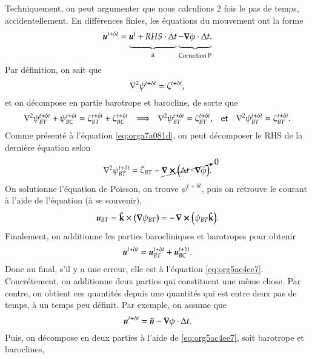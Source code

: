 \documentclass[10pt]{article}
\numberwithin{equation}{section}
\newcommand{\kvf}{\vb{\hat{k}}}
\newcommand{\uu}{\vb*{u}}
\newcommand{\pt}{\hspace{1pt}}
\newcommand{\tall}{\vphantom{A^{x^x}_p}}
\begin{document}
Techniquement, on peut argumenter que nous calculions 2 fois le pas de temps, accidentellement.
En différences finies, les équations du mouvement ont la forme
\begin{equation}
\label{eq:orga7a081d}
   \uu^{t+\delta t} =
   \underbrace{\uu^t + RHS\cdot \Delta t\tall}_{\tilde{u}}
   \underbrace{- \gradient{\phi}\cdot \Delta t.\tall}_\text{Correction P}
\end{equation}
Par définition, on sait que
\begin{equation}
   \laplacian{\psi^{t+\delta t}} = \zeta^{t+\delta t},
\end{equation}
et on décompose en partie barotrope et barocline, de sorte que
\begin{align}
   && \laplacian{\psi^{t+\delta t}_{BT} + \psi^{t+\delta t}_{BC}} = \zeta^{t+\delta t}_{BT} + \zeta^{t+\delta t}_{BC}
   && \Longrightarrow
   && \laplacian{\psi^{t+\delta t}}_{BT} = \zeta^{t+\delta t}_{BT},
   && \text{et}
   && \laplacian{\psi^{t+\delta t}}_{BT} = \zeta^{t+\delta t}_{BT}.&&
\end{align}
Comme présenté à l'équation \ref{eq:orga7a081d}, on peut décomposer le RHS de la dernière équation selon
\begin{align}
   \laplacian{\psi^{t+\delta t}}_{BT} = \tilde{\zeta}_{BT} - \cancelto{0}{\curl(\Delta t\cdot\gradient{\phi})}.
\end{align}
On solutionne l'équation de Poisson, on trouve \(\psi^{t+\delta t}\), puis on retrouve le courant à l'aide de l'équation (à se souvenir), 
\begin{equation}
   \uu_{BT} = \kvf \times \qty(\gradient{\psi_{BT}}) = - \pt\curl(\psi_{BT}\kvf).
\end{equation}
Finalement, on additionne les parties barocliniques et barotropes pour obtenir
\begin{equation}
\label{eq:org5ac4ee7}
   \uu^{t+\delta t} = \uu_{BT}^{t+\delta t} + \uu_{BC}^{t+\delta t}.
\end{equation}
Donc au final, s'il y a une erreur, elle est à l'équation \ref{eq:org5ac4ee7}.
Concrétement, on additionne deux parties qui constituent une même chose.
Par contre, on obtient ces quantités depuis une quantités qui est entre deux pas de temps, à un temps peu définit.
Par exemple, on assume que
\begin{equation}
   \uu^{t+\delta t} = \tilde{\uu} - \gradient{\phi} \cdot \Delta t.
\end{equation}
Puis, on décompose en deux parties à l'aide de \ref{eq:org5ac4ee7}, soit barotrope et baroclines,
\end{document}
